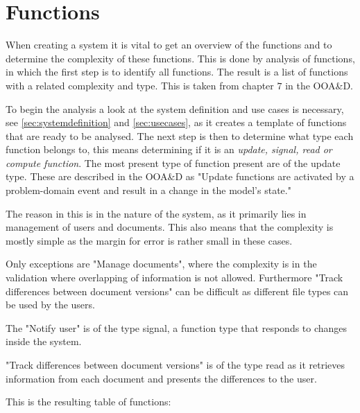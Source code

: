 \section{Functions}
When creating a system it is vital to get an overview of the functions and to determine the complexity of these functions.
This is done by analysis of functions, in which the first step is to identify all functions.
The result is a list of functions with a related complexity and type.
This is taken from chapter $7$ in the OOA\&D.\citep[ch.~7]{Rod-Aalborg}

To begin the analysis a look at the system definition and use cases is necessary, see \cref{sec:systemdefinition} and \cref{sec:usecases}, as it creates a template of functions that are ready to be analysed.
The next step is then to determine what type each function belongs to, this means determining if it is an \textit{update, signal, read or compute function}.
The most present type of function present are of the update type.
These are described in the OOA\&D as "Update functions are activated by a problem-domain event and result in a change in the model's state."\citep[p.~140]{Rod-Aalborg}


The reason in this is in the nature of the system, as it primarily lies in management of users and documents.
This also means that the complexity is mostly simple as the margin for error is rather small in these cases. 

Only exceptions are "Manage documents", where the complexity is in the validation where overlapping of information is not allowed.
Furthermore "Track differences between document versions" can be difficult as different file types can be used by the users.

The "Notify user" is of the type signal, a function type that responds to changes inside the system.

"Track differences between document versions" is of the type read as it retrieves information from each document and presents the differences to the user.

This is the resulting table of functions:

